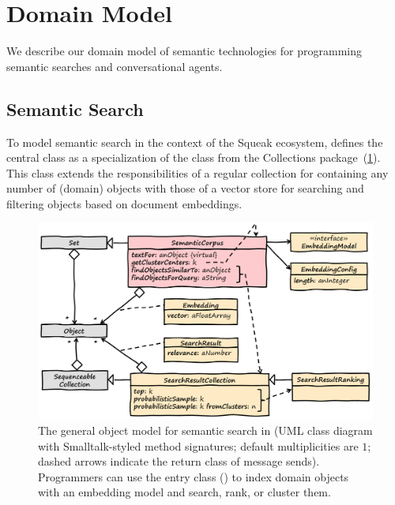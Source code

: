 
\section{Domain Model}
\label{sec:semtex/model}

We describe our domain model of semantic technologies for programming semantic searches and conversational agents.

\subsection{Semantic Search}
\label{sec:semtex/model/search}

To model semantic search in the context of the Squeak ecosystem, \semtex defines the central class  as a specialization of the  class from the Collections package~(\cref{fig:semtex/model/search}).
This class extends the responsibilities of a regular collection for containing any number of (domain) objects with those of a vector store for searching and filtering objects based on document embeddings.

\begin{figure}
	\centering
	\includegraphics[width=\textwidth]{01_model/search.png}
	\caption[The general object model for semantic search in \semtex.]{
		The general object model for semantic search in \semtex (UML class diagram with Smalltalk-styled method signatures; default multiplicities are $1$; dashed arrows indicate the return class of message sends).
		Programmers can use the entry class  (\bold{\textcolor{red}{red}}) to index domain objects with an embedding model and search, rank, or cluster them.
	}
	\label{fig:semtex/model/search}
\end{figure}

